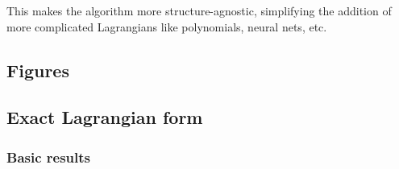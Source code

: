 \documentclass[]{article}
\begin{document}
This makes the algorithm more structure-agnostic, simplifying the addition of more complicated Lagrangians like polynomials, neural nets, etc. 



\newpage
\begin{appendices}
\section{Figures}

\subsection{Exact Lagrangian form}
\subsubsection{Basic results}


\end{appendices}
\end{document}
